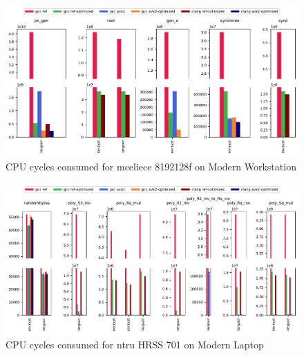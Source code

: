





\begin{figure}
    \centering
    \includegraphics[width=\textwidth]{chapters/results/micro/mceliece_8192128f_Modern Workstation_cpu-cycles.pdf}
    \caption{CPU cycles consumed for \gls{mceliece} 8192128f on Modern Workstation}
    \label{figure:results:micro:mceliece-8192128f-modern-workstation}
\end{figure}

\begin{figure}
    \centering
    \includegraphics[width=\textwidth]{chapters/results/micro/ntru_hrss701_Modern Laptop_cpu-cycles.pdf}
    \caption{CPU cycles consumed for \gls{ntru} HRSS 701 on Modern Laptop}
    \label{figure:results:micro:ntru-hrss701-modern-laptop}
\end{figure}